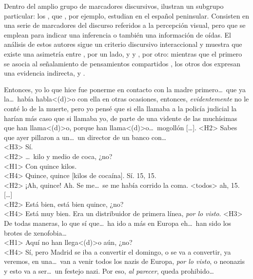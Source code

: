 Dentro del amplio grupo de marcadores discursivos,  ilustran un subgrupo particular: los , que \textcite[8--9]{cornillie2015}, por ejemplo,
estudian en el español peninsular. Consisten en una serie de marcadores del
discurso referidos a la percepción visual, pero que se emplean para indicar una
inferencia o también una información de oídas. El análisis de estos autores
sigue un criterio discursivo interaccional y muestra que existe una asimetría
entre , por un lado, y  y , por otro: mientras que el primero se asocia al señalamiento de
pensamientos compartidos , los otros dos expresan una
evidencia indirecta,  y .

\begin{exe}
  \ex\label{ex:14-vidente} Entonces, yo lo que hice fue ponerme en contacto con
      la madre primero\ldots\ que ya la\ldots\ había habla<(d)>o con ella en otras
      ocasiones, entonces, \textit{evidentemente} no le conté lo de la muerte,
      pero yo pensé que si ella llamaba a la policía judicial la harían más caso
      que si llamaba yo, de parte de una vidente de las muchísimas que han
      llama<(d)>o, porque han llama<(d)>o\ldots\ mogollón [\ldots].
  \ex\label{ex:14-coca} <H2> Sabes que ayer pillaron a un\ldots\ un director de
      un banco con\ldots\\
      <H3> Sí.\\
      <H2> \ldots\ kilo y medio de coca, ¿no?\\
      <H1> Con quince kilos.\\
      <H4> Quince, quince [kilos de cocaína]. Sí. 15, 15.\\
      <H2> ¡Ah, quince! Ah. Se me\ldots\ se me había corrido la coma. <todos> ah,
      15. [\ldots]\\
      <H2> Está bien, está bien quince, ¿no?\\
      <H4> Está muy bien. Era un distribuidor de primera línea, \textit{por lo
      visto}.
  \ex\label{ex:14-nazis} <H3> De todas maneras, lo que sí que\ldots\ ha ido a más
      en Europa eh\ldots\ han sido los brotes de xenofobia\ldots\\
      <H1> Aquí no han llega<(d)>o aún, ¿no?\\
      <H4> Sí, pero Madrid se iba a convertir el domingo, o se va a convertir, ya
      veremos, en una\ldots\ van a venir todos los nazis de Europa, \textit{por
      lo visto}, o neonazis y esto va a ser\ldots\ un festejo nazi. Por eso,
      \textit{al parecer}, queda prohibido\ldots
\end{exe}


